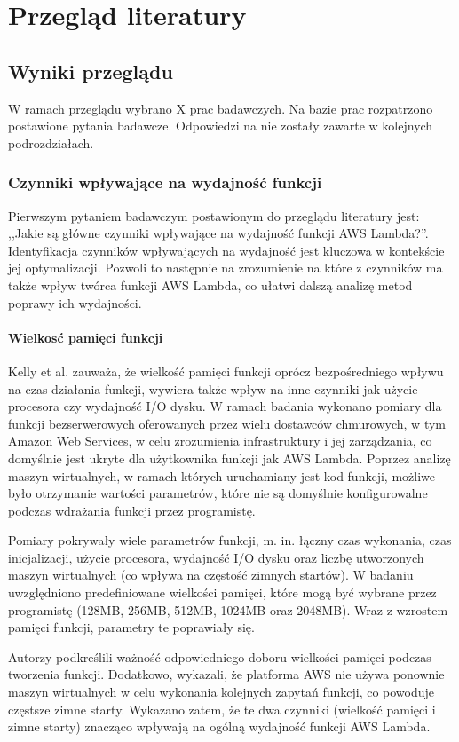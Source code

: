 \chapter{Przegląd literatury}\label{chapter:przeglad_literatury}

\section{Wyniki przeglądu}\label{chapter:przeglad_literatury_wyniki}

W ramach przeglądu wybrano X prac badawczych. Na bazie prac rozpatrzono postawione pytania badawcze. Odpowiedzi na nie zostały zawarte w kolejnych podrozdziałach.

\subsection{Czynniki wpływające na wydajność funkcji}\label{chapter:przeglad_literatury_wyniki_czynniki}

Pierwszym pytaniem badawczym postawionym do przeglądu literatury jest: ,,Jakie są główne czynniki wpływające na wydajność funkcji AWS Lambda?''.
Identyfikacja czynników wpływających na wydajność jest kluczowa w kontekście jej optymalizacji.
Pozwoli to następnie na zrozumienie na które z czynników ma także wpływ twórca funkcji AWS Lambda, co ułatwi dalszą analizę metod poprawy ich wydajności.

\subsubsection*{Wielkosć pamięci funkcji}

Kelly et al. \cite{9284261} zauważa, że wielkość pamięci funkcji oprócz bezpośredniego wpływu na czas działania funkcji, wywiera także wpływ na inne czynniki jak użycie procesora czy wydajność I/O dysku. 
W ramach badania wykonano pomiary dla funkcji bezserwerowych oferowanych przez wielu dostawców chmurowych, w tym Amazon Web Services, w celu zrozumienia infrastruktury i jej zarządzania, co domyślnie jest ukryte dla użytkownika funkcji jak AWS Lambda.   
Poprzez analizę maszyn wirtualnych, w ramach których uruchamiany jest kod funkcji, możliwe było otrzymanie wartości parametrów, które nie są domyślnie konfigurowalne podczas wdrażania funkcji przez programistę.

Pomiary pokrywały wiele parametrów funkcji, m. in. łączny czas wykonania, czas inicjalizacji, użycie procesora, wydajność I/O dysku oraz liczbę utworzonych maszyn wirtualnych (co wpływa na częstość zimnych startów). 
W badaniu uwzględniono predefiniowane wielkości pamięci, które mogą być wybrane przez programistę (128MB, 256MB, 512MB, 1024MB oraz 2048MB).
Wraz z wzrostem pamięci funkcji, parametry te poprawiały się.

Autorzy podkreślili ważność odpowiedniego doboru wielkości pamięci podczas tworzenia funkcji. Dodatkowo, wykazali, że platforma AWS nie używa ponownie maszyn wirtualnych w celu wykonania kolejnych zapytań funkcji, co powoduje częstsze zimne starty. Wykazano zatem, że te dwa czynniki (wielkość pamięci i zimne starty) znacząco wpływają na ogólną wydajność funkcji AWS Lambda.